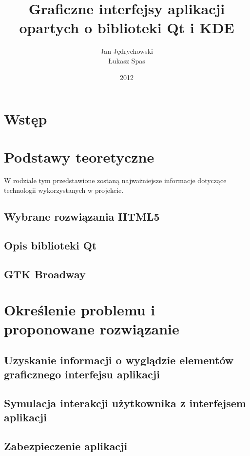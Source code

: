 \documentclass[polish]{inz}
\title{Graficzne interfejsy aplikacji opartych o biblioteki Qt i KDE}
\author{Jan Jędrychowski\\Łukasz Spas}
\date{2012}
\begin{document}
\maketitle

\chapter{Wstęp}


\chapter{Podstawy teoretyczne}
W rodziale tym przedstawione zostaną najważniejsze informacje dotyczące technologii wykorzystanych w projekcie. 

\section{Wybrane rozwiązania HTML5}


\section{Opis biblioteki Qt}


\section{GTK Broadway}


\chapter{Określenie problemu i proponowane rozwiązanie}



\section{Uzyskanie informacji o wyglądzie elementów graficznego interfejsu aplikacji}



\section{Symulacja interakcji użytkownika z interfejsem aplikacji}


\section{Zabezpieczenie aplikacji}

\end{document}
